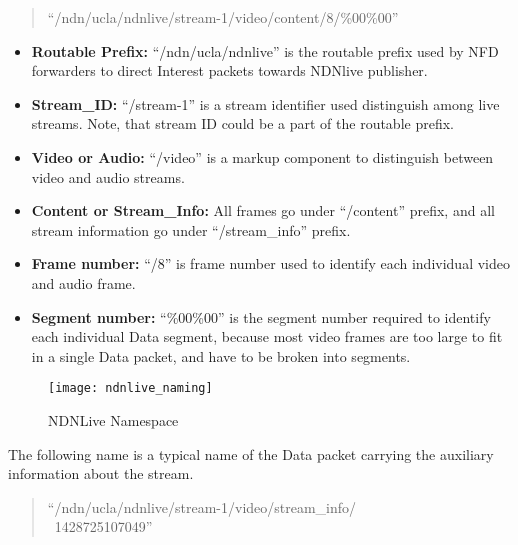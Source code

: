\begin{quote}
``/ndn/ucla/ndnlive/stream-1/video/content/8/\%00\%00''
\end{quote}
\begin{itemize}
	\item{\textbf{Routable Prefix:}} ``/ndn/ucla/ndnlive'' is the routable prefix used by NFD forwarders to direct  Interest packets towards NDNlive publisher.
	\item{\textbf{Stream\_ID:}} ``/stream-1'' is a stream identifier used distinguish among live streams. Note, that stream ID could be a part of the routable prefix.
	\item{\textbf{Video or Audio:}} ``/video'' is a markup component to distinguish between video and audio streams.
	\item{\textbf{Content or Stream\_Info:}} All frames go under ``/content'' prefix, and all stream information go under ``/stream\_info'' prefix.
	\item{\textbf{Frame number:}} ``/8'' is frame number used to identify each individual video and audio frame.
	\item{\textbf{Segment number:}} ``\%00\%00'' is the segment number required to identify each individual Data segment, because most video frames are too large to fit in a single Data packet, and have to be broken into segments. 
	
\end{itemize}


\begin{figure}[htbp]
  \centering
  \texttt{[image: ndnlive\_naming]}
  \caption{NDNLive Namespace}
  \label{fig:ndnlive_naming}
\end{figure}


The following name is a typical name of the Data packet carrying the auxiliary information about the stream.
\begin{quote}
``/ndn/ucla/ndnlive/stream-1/video/stream\_info/ \\\ 1428725107049''
\end{quote}

